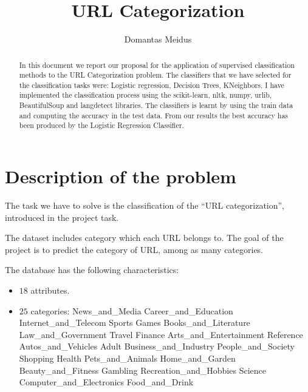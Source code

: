 \documentclass{article} %
\title{URL Categorization}
\author{Domantas Meidus}
\begin{document}
\maketitle



\begin{abstract}
  In this document we report our proposal for the application of supervised classification methods to the URL Categorization problem. The classifiers that we have selected for the classification tasks were: Logistic regression, Decision Trees, KNeighbors. I have implemented the classification process using the scikit-learn, nltk, numpy, urlib, BeautifulSoup and langdetect libraries. The classifiers is learnt by using the train data and computing the accuracy in the test data. From our results the best accuracy has been produced by the Logistic Regression Classifier.
\end{abstract}

\section{Description of the problem}
 
 The task we have to solve is the classification of the  ``URL categorization'', introduced in the project task. 
 
 The dataset includes category which each URL belongs to. The goal of the project is to predict the category of URL, among as many categories.

  The database has the following characteristics: 

\begin{itemize}
  \item $18$ attributes.
  \item $25$ categories:
  	 News\_and\_Media
  	 Career\_and\_Education
  	 Internet\_and\_Telecom
  	 Sports
  	 Games
  	 Books\_and\_Literature
  	 Law\_and\_Government
  	 Travel
  	 Finance
  	 Arts\_and\_Entertainment
  	 Reference
  	 Autos\_and\_Vehicles
  	 Adult
  	 Business\_and\_Industry
  	 People\_and\_Society
  	 Shopping
  	 Health
  	 Pets\_and\_Animals
  	 Home\_and\_Garden
  	 Beauty\_and\_Fitness
  	 Gambling
  	 Recreation\_and\_Hobbies
  	 Science
  	 Computer\_and\_Electronics
  	 Food\_and\_Drink
\end{itemize}
\end{document}
